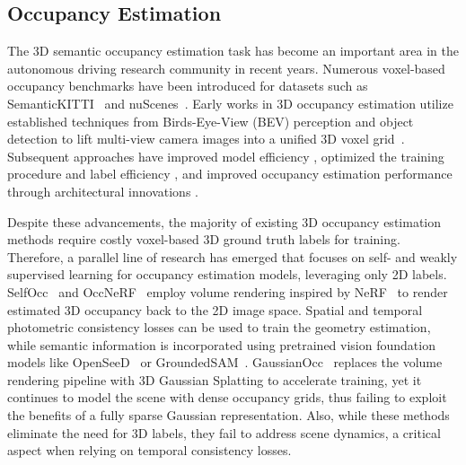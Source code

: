 \documentclass[10pt,twocolumn,letterpaper]{article}
\begin{document}
\subsection{Occupancy Estimation}
The 3D semantic occupancy estimation task has become an important area in the autonomous driving research community in recent years.
Numerous voxel-based occupancy benchmarks have been introduced for datasets such as SemanticKITTI~\cite{behley2019semantickitti} and nuScenes~\cite{tian2023occ3d, wang2023openoccupancy}.
Early works in 3D occupancy estimation utilize established techniques from Birds-Eye-View (BEV) perception and object detection \cite{huang2021bevdet,li2022bevformer} to lift multi-view camera images into a unified 3D voxel grid~\cite{huang2023tri, huang2022bevdet4d, tong2023scene, cao2022monoscene, li2023voxformer}.
Subsequent approaches have improved model efficiency \cite{yu2023flashocc, wang2024opus, lu2023octreeocc, liu2024fully, shi2025occupancy, tang2024sparseocc, huang2024gaussianformer}, optimized the training procedure and label efficiency \cite{pan2023renderocc, boeder2024occflownet, gan2023simple, hayler2024s4c, sun2024gsrender}, and improved occupancy estimation performance through architectural innovations \cite{li2023fb, zhang2023occformer, jiang2023symphonize, tan2024geocc, Zhao_2024_CVPR, ma2024cotr, ma2024cam4docc}.

Despite these advancements, the majority of existing 3D occupancy estimation methods require costly voxel-based 3D ground truth labels for training.
Therefore, a parallel line of research has emerged that focuses on self- and weakly supervised learning for occupancy estimation models, leveraging only 2D labels.
SelfOcc~\cite{huang2023selfocc} and OccNeRF~\cite{zhang2023occnerf} employ volume rendering inspired by NeRF~\cite{mildenhall2021nerf} to render estimated 3D occupancy back to the 2D image space. 
Spatial and temporal photometric consistency losses can be used to train the geometry estimation, while semantic information is incorporated using pretrained vision foundation models like OpenSeeD~\cite{zhang2023simple} or GroundedSAM~\cite{ren2024grounded}.
GaussianOcc~\cite{gan2024gaussianocc} replaces the volume rendering pipeline with 3D Gaussian Splatting to accelerate training, yet it continues to model the scene with dense occupancy grids, thus failing to exploit the benefits of a fully sparse Gaussian representation.
Also, while these methods eliminate the need for 3D labels, they fail to address scene dynamics, a critical aspect when relying on temporal consistency losses.
\end{document}
